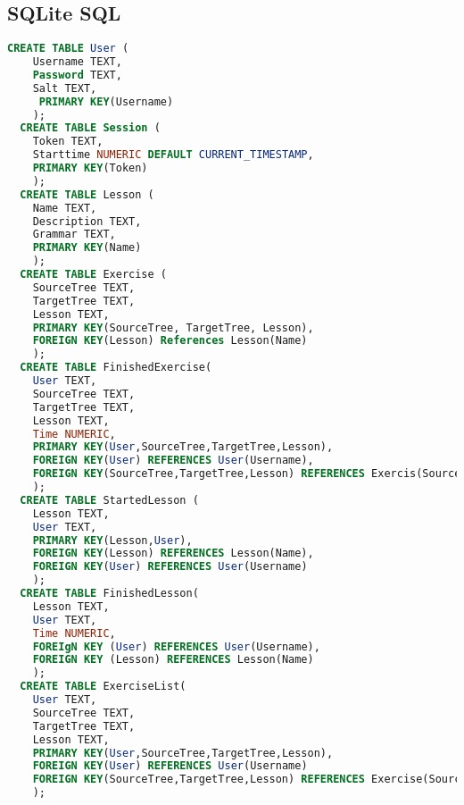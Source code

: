 \documentclass{scrartcl}
\begin{document}
\subsection{SQLite SQL}

\begin{lstlisting}[language=SQL]
  CREATE TABLE User (
    Username TEXT,
    Password TEXT,
    Salt TEXT,
     PRIMARY KEY(Username)
    );
  CREATE TABLE Session (
    Token TEXT,
    Starttime NUMERIC DEFAULT CURRENT_TIMESTAMP,
    PRIMARY KEY(Token)
    );
  CREATE TABLE Lesson (
    Name TEXT,
    Description TEXT,
    Grammar TEXT,
    PRIMARY KEY(Name)
    );
  CREATE TABLE Exercise (
    SourceTree TEXT,
    TargetTree TEXT,
    Lesson TEXT,
    PRIMARY KEY(SourceTree, TargetTree, Lesson),
    FOREIGN KEY(Lesson) References Lesson(Name)
    );
  CREATE TABLE FinishedExercise(
    User TEXT,
    SourceTree TEXT,
    TargetTree TEXT,
    Lesson TEXT,
    Time NUMERIC,
    PRIMARY KEY(User,SourceTree,TargetTree,Lesson),
    FOREIGN KEY(User) REFERENCES User(Username),
    FOREIGN KEY(SourceTree,TargetTree,Lesson) REFERENCES Exercis(SourceTree,TargetTree,Lesson)
    );
  CREATE TABLE StartedLesson (
    Lesson TEXT,
    User TEXT,
    PRIMARY KEY(Lesson,User),
    FOREIGN KEY(Lesson) REFERENCES Lesson(Name),
    FOREIGN KEY(User) REFERENCES User(Username)
    );
  CREATE TABLE FinishedLesson(
    Lesson TEXT,
    User TEXT,
    Time NUMERIC,
    FOREIgN KEY (User) REFERENCES User(Username),
    FOREIGN KEY (Lesson) REFERENCES Lesson(Name)
    );
  CREATE TABLE ExerciseList(
    User TEXT,
    SourceTree TEXT,
    TargetTree TEXT,
    Lesson TEXT,
    PRIMARY KEY(User,SourceTree,TargetTree,Lesson),
    FOREIGN KEY(User) REFERENCES User(Username)
    FOREIGN KEY(SourceTree,TargetTree,Lesson) REFERENCES Exercise(SourceTree,TargetTree,Lesson)
    );
\end{lstlisting}
\end{document}
